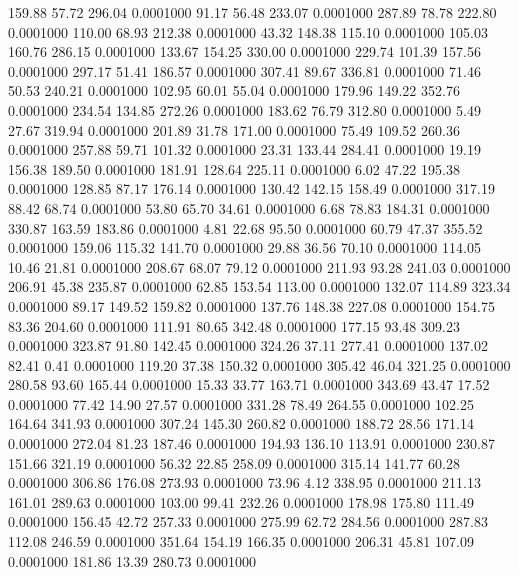  159.88   57.72  296.04   0.0001000
  91.17   56.48  233.07   0.0001000
 287.89   78.78  222.80   0.0001000
 110.00   68.93  212.38   0.0001000
  43.32  148.38  115.10   0.0001000
 105.03  160.76  286.15   0.0001000
 133.67  154.25  330.00   0.0001000
 229.74  101.39  157.56   0.0001000
 297.17   51.41  186.57   0.0001000
 307.41   89.67  336.81   0.0001000
  71.46   50.53  240.21   0.0001000
 102.95   60.01   55.04   0.0001000
 179.96  149.22  352.76   0.0001000
 234.54  134.85  272.26   0.0001000
 183.62   76.79  312.80   0.0001000
   5.49   27.67  319.94   0.0001000
 201.89   31.78  171.00   0.0001000
  75.49  109.52  260.36   0.0001000
 257.88   59.71  101.32   0.0001000
  23.31  133.44  284.41   0.0001000
  19.19  156.38  189.50   0.0001000
 181.91  128.64  225.11   0.0001000
   6.02   47.22  195.38   0.0001000
 128.85   87.17  176.14   0.0001000
 130.42  142.15  158.49   0.0001000
 317.19   88.42   68.74   0.0001000
  53.80   65.70   34.61   0.0001000
   6.68   78.83  184.31   0.0001000
 330.87  163.59  183.86   0.0001000
   4.81   22.68   95.50   0.0001000
  60.79   47.37  355.52   0.0001000
 159.06  115.32  141.70   0.0001000
  29.88   36.56   70.10   0.0001000
 114.05   10.46   21.81   0.0001000
 208.67   68.07   79.12   0.0001000
 211.93   93.28  241.03   0.0001000
 206.91   45.38  235.87   0.0001000
  62.85  153.54  113.00   0.0001000
 132.07  114.89  323.34   0.0001000
  89.17  149.52  159.82   0.0001000
 137.76  148.38  227.08   0.0001000
 154.75   83.36  204.60   0.0001000
 111.91   80.65  342.48   0.0001000
 177.15   93.48  309.23   0.0001000
 323.87   91.80  142.45   0.0001000
 324.26   37.11  277.41   0.0001000
 137.02   82.41    0.41   0.0001000
 119.20   37.38  150.32   0.0001000
 305.42   46.04  321.25   0.0001000
 280.58   93.60  165.44   0.0001000
  15.33   33.77  163.71   0.0001000
 343.69   43.47   17.52   0.0001000
  77.42   14.90   27.57   0.0001000
 331.28   78.49  264.55   0.0001000
 102.25  164.64  341.93   0.0001000
 307.24  145.30  260.82   0.0001000
 188.72   28.56  171.14   0.0001000
 272.04   81.23  187.46   0.0001000
 194.93  136.10  113.91   0.0001000
 230.87  151.66  321.19   0.0001000
  56.32   22.85  258.09   0.0001000
 315.14  141.77   60.28   0.0001000
 306.86  176.08  273.93   0.0001000
  73.96    4.12  338.95   0.0001000
 211.13  161.01  289.63   0.0001000
 103.00   99.41  232.26   0.0001000
 178.98  175.80  111.49   0.0001000
 156.45   42.72  257.33   0.0001000
 275.99   62.72  284.56   0.0001000
 287.83  112.08  246.59   0.0001000
 351.64  154.19  166.35   0.0001000
 206.31   45.81  107.09   0.0001000
 181.86   13.39  280.73   0.0001000
